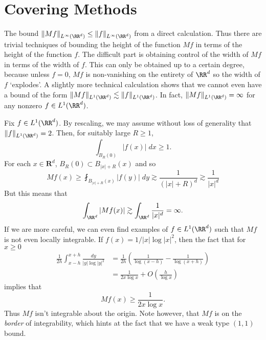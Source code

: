 \section{Covering Methods}

The bound $\| Mf \|_{L^\infty(\RR^d)} \leq \| f \|_{L^\infty(\RR^d)}$ from a direct calculation. Thus there are trivial techniques of bounding the height of the function $Mf$ in terms of the height of the function $f$. The difficult part is obtaining control of the width of $Mf$ in terms of the width of $f$. This can only be obtained up to a certain degree, because unless $f = 0$, $Mf$ is non-vanishing on the entirety of $\RR^d$ so the width of $f$ `explodes'. A slightly more technical calculation shows that we cannot even have a bound of the form $\| Mf \|_{L^1(\RR^d)} \lesssim \| f \|_{L^1(\RR^d)}$. In fact, $\| Mf \|_{L^1(\RR^d)} = \infty$ for any nonzero $f \in L^1(\RR^d)$.

\begin{example}
  Fix $f \in L^1(\RR^d)$. By rescaling, we may assume without loss of generality that $\| f \|_{L^1(\RR^d)} = 2$. Then, for suitably large $R \geq 1$,
  \[ \int_{B_R(0)} |f(x)|\; dx \geq 1. \]
  For each $x \in \mathbf{R}^d$, $B_R(0) \subset B_{|x|+R}(x)$ and so
  \[ Mf(x) \geq \fint_{B_{|x|+R}(x)} |f(y)|\; dy \gtrsim \frac{1}{(|x| + R)^d} \gtrsim \frac{1}{|x|^d} \]
  But this means that
  \[ \int_{\RR^d} |Mf(x)| \gtrsim \int_{\RR^d} \frac{1}{|x|^d} = \infty. \]
  If we are more careful, we can even find examples of $f \in L^1(\RR^d)$ such that $Mf$ is not even locally integrable. If $f(x) = 1/|x| \log|x|^2$, then the fact that for $x \geq 0$
  \begin{align*}
    \frac{1}{2h} \int_{x-h}^{x+h} \frac{dy}{|y| \log |y|^2} &= \frac{1}{2h} \left( \frac{1}{\log(x-h)} - \frac{1}{\log(x+h)} \right)\\
    &= \frac{1}{2x \log x} + O \left( \frac{h}{\log x} \right)
  \end{align*}
  implies that
  \[ Mf(x) \geq \frac{1}{2x \log x}. \]
  Thus $Mf$ isn't integrable about the origin. Note however, that $Mf$ is on the \emph{border} of integrability, which hints at the fact that we have a weak type $(1,1)$ bound.
\end{example}

